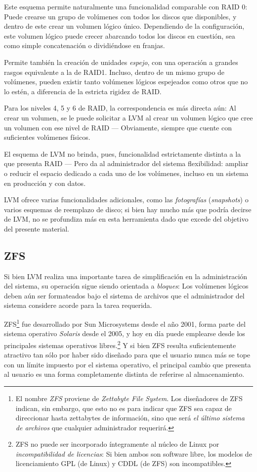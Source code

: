 \documentclass[11pt,fleqn]{book} %
\begin{document}
Este esquema permite naturalmente una funcionalidad comparable con
RAID 0: Puede crearse un grupo de volúmenes con todos los discos que
disponibles, y dentro de este crear un volumen lógico
único. Dependiendo de la configuración, este volumen lógico puede
crecer abarcando todos los discos en cuestión, sea como simple
concatenación o dividiéndose en franjas.

Permite también la creación de unidades \emph{espejo}, con una operación
a grandes rasgos equivalente a la de RAID1. Incluso, dentro de un
mismo grupo de volúmenes, pueden existir tanto volúmenes lógicos
espejeados como otros que no lo estén, a diferencia de la estricta
rigidez de RAID.

Para los niveles 4, 5 y 6 de RAID, la correspondencia es más directa
aún: Al crear un volumen, se le puede solicitar a LVM al crear un
volumen lógico que cree un volumen con ese nivel de RAID — Obviamente,
siempre que cuente con suficientes volúmenes físicos.

El esquema de LVM no brinda, pues, funcionalidad estrictamente
distinta a la que presenta RAID — Pero da al administrador del sistema
flexibilidad: ampliar o reducir el espacio dedicado a cada uno de los
volúmenes, incluso en un sistema en producción y con datos.

LVM ofrece varias funcionalidades adicionales, como las \emph{fotografías}
(\emph{snapshots}) o varios esquemas de reemplazo de disco; si bien hay
mucho más que podría decirse de LVM, no se profundiza más en esta
herramienta dado que excede del objetivo del presente material.
\subsection{ZFS}
\label{sec-10-3-2}
\label{FS_FIS_zfs}


Si bien LVM realiza una importante tarea de simplificación en la
administración del sistema, su operación sigue siendo orientada a
\emph{bloques}: Los volúmenes lógicos deben aún ser formateados bajo el
sistema de archivos que el administrador del sistema considere acorde
para la tarea requerida.

ZFS\footnote{El nombre \emph{ZFS} proviene de \emph{Zettabyte File System}. Los
diseñadores de ZFS indican, sin embargo, que esto no es para indicar
que ZFS sea capaz de direccionar hasta zettabytes de información, sino
que será \emph{el último sistema de archivos} que cualquier administrador
requerirá. } fue desarrollado por Sun Microsystems desde el año 2001,
forma parte del sistema operativo \emph{Solaris} desde el 2005, y hoy en
día puede emplearse desde los principales sistemas operativos
libres.\footnote{ZFS no puede ser incorporado íntegramente al núcleo de
Linux por \emph{incompatibilidad de licencias}: Si bien ambos son software
libre, los modelos de licenciamiento GPL (de Linux) y CDDL (de ZFS)
son incompatibles. } Y si bien ZFS resulta suficientemente atractivo
tan sólo por haber sido diseñado para que el usuario nunca más se tope
con un límite impuesto por el sistema operativo, el principal cambio
que presenta al usuario es una forma completamente distinta de
referirse al almacenamiento.
\end{document}
